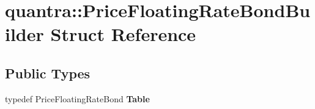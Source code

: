 \hypertarget{structquantra_1_1PriceFloatingRateBondBuilder}{}\section{quantra\+:\+:Price\+Floating\+Rate\+Bond\+Builder Struct Reference}
\label{structquantra_1_1PriceFloatingRateBondBuilder}
\subsection*{Public Types}
\begin{DoxyCompactItemize}
\item 
\mbox{\label{structquantra_1_1PriceFloatingRateBondBuilder_a80b16daefbc7485c184f8c85b210126c}} 
typedef Price\+Floating\+Rate\+Bond {\bfseries Table}
\end{DoxyCompactItemize}
